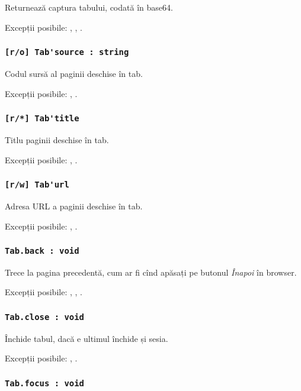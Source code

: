 Returnează captura tabului, codată în base64.

Excepții posibile: , , .

\subsubsection{\lstinline|[r/o] Tab'source : string|}

Codul sursă al paginii deschise în tab.

Excepții posibile: , .

\subsubsection{\lstinline|[r/*] Tab'title|}

Titlu paginii deschise în tab.

Excepții posibile: , .

\subsubsection{\lstinline|[r/w] Tab'url|}

Adresa URL a paginii deschise în tab.

Excepții posibile: , .

\subsubsection{\lstinline|Tab.back : void|}

Trece la pagina precedentă, cum ar fi cînd apăsați pe butonul \textit{Înapoi} în browser.

Excepții posibile: , , .

\subsubsection{\lstinline|Tab.close : void|}

Închide tabul, dacă e ultimul închide și sesia.

Excepții posibile: , .

\subsubsection{\lstinline|Tab.focus : void|}

